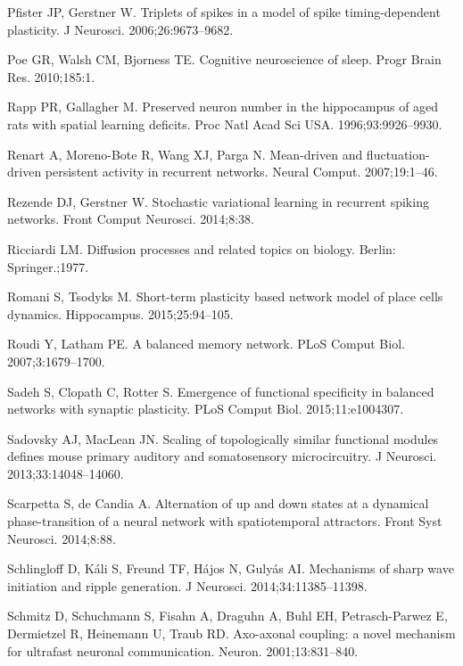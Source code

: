 \begin{thebibliography}{}
Pfister JP, Gerstner W.
\newblock Triplets of spikes in a model of spike timing-dependent plasticity.
\newblock J Neurosci. 2006;26:9673--9682.

Poe GR, Walsh CM, Bjorness TE.
\newblock Cognitive neuroscience of sleep.
\newblock Progr Brain Res. 2010;185:1.

Rapp PR, Gallagher M.
\newblock Preserved neuron number in the hippocampus of aged rats with spatial learning deficits.
\newblock Proc Natl Acad Sci USA. 1996;93:9926--9930.

Renart A, Moreno-Bote R, Wang XJ, Parga N.
\newblock Mean-driven and fluctuation-driven persistent activity in recurrent networks.
\newblock Neural Comput. 2007;19:1--46.

Rezende DJ, Gerstner W.
\newblock Stochastic variational learning in recurrent spiking networks.
\newblock Front Comput Neurosci. 2014;8:38.

Ricciardi LM.
\newblock Diffusion processes and related topics on biology.
\newblock Berlin: Springer.;1977.

Romani S, Tsodyks M.
\newblock Short-term plasticity based network model of place cells dynamics.
\newblock Hippocampus. 2015;25:94--105.

Roudi Y, Latham PE.
\newblock A balanced memory network.
\newblock PLoS Comput Biol. 2007;3:1679--1700.

Sadeh S, Clopath C, Rotter S.
\newblock Emergence of functional specificity in balanced networks with synaptic plasticity.
\newblock PLoS Comput Biol. 2015;11:e1004307.

Sadovsky AJ, MacLean JN.
\newblock Scaling of topologically similar functional modules defines mouse
  primary auditory and somatosensory microcircuitry.
\newblock J Neurosci. 2013;33:14048--14060.

Scarpetta S, de Candia A.
\newblock Alternation of up and down states at a dynamical phase-transition of a neural network with spatiotemporal attractors.
\newblock Front Syst Neurosci. 2014;8:88.

Schlingloff D, K\'ali S, Freund TF, H\'ajos N, Guly\'as AI.
\newblock Mechanisms of sharp wave initiation and ripple generation.
\newblock J Neurosci. 2014;34:11385--11398.

Schmitz D, Schuchmann S, Fisahn A, Draguhn A, Buhl EH, Petrasch-Parwez E, Dermietzel R, Heinemann U, Traub RD.
\newblock Axo-axonal coupling: a novel mechanism for ultrafast neuronal communication.
\newblock Neuron. 2001;13:831--840.


\end{thebibliography}
